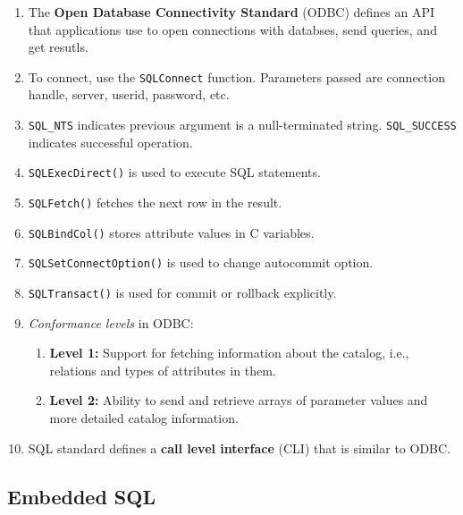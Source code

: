 \documentclass[journal,12pt,twocolumn]{IEEEtran}
\begin{document}
\begin{enumerate}
     \item The \textbf{Open Database Connectivity Standard} (ODBC) defines an 
     API that applications use to open connections with databses, send queries,
     and get resutls.
     \item To connect, use the \texttt{SQLConnect} function. Parameters passed
     are connection handle, server, userid, password, etc.
     \item \texttt{SQL\_NTS} indicates previous argument is a null-terminated 
     string. \texttt{SQL\_SUCCESS} indicates successful operation.
     \item \texttt{SQLExecDirect()} is used to execute SQL statements.
     \item \texttt{SQLFetch()} fetches the next row in the result.
     \item \texttt{SQLBindCol()} stores attribute values in C variables.
     \item \texttt{SQLSetConnectOption()} is used to change autocommit option.
     \item \texttt{SQLTransact()} is used for commit or rollback explicitly.
     \item \textit{Conformance levels} in ODBC:
     \begin{enumerate}
          \item \textbf{Level 1:} Support for fetching information about the 
          catalog, i.e., relations and types of attributes in them.
          \item \textbf{Level 2:} Ability to send and retrieve arrays of
          parameter values and more detailed catalog information.
     \end{enumerate}
     \item SQL standard defines a \textbf{call level interface} (CLI) that is 
     similar to ODBC.
\end{enumerate}

\subsection{Embedded SQL}
\end{document}
